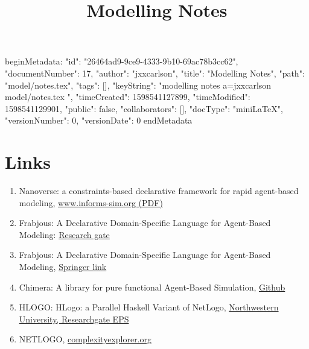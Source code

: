 beginMetadata:
{
    "id": "26464ad9-9ce9-4333-9b10-69ac78b3cc62",
    "documentNumber": 17,
    "author": "jxxcarlson",
    "title": "Modelling Notes",
    "path": "model/notes.tex",
    "tags": [],
    "keyString": "modelling notes a=jxxcarlson model/notes.tex ",
    "timeCreated": 1598541127899,
    "timeModified": 1598541129901,
    "public": false,
    "collaborators": [],
    "docType": "miniLaTeX",
    "versionNumber": 0,
    "versionDate": 0
}
endMetadata
\title{Modelling Notes}

\maketitle

\section{Links}

\begin{enumerate}

\item Nanoverse: a  constraints-based declarative framework for rapid agent-based modeling,
 \href{https://www.informs-sim.org/wsc15papers/017.pdf}{www.informs-sim.org (PDF)}

\item Frabjous: A Declarative Domain-Specific Language for Agent-Based Modeling: \href{https://www.researchgate.net/publication/300865960_Frabjous_A_Declarative_Domain-Specific_Language_for_Agent-Based_Modeling}{Research gate}

\item Frabjous: A Declarative Domain-Specific Language for Agent-Based Modeling, \href{https://link.springer.com/chapter/10.1007/978-3-319-05579-4_47}{Springer link}

\item Chimera: A library for pure functional Agent-Based Simulation, \href{https://github.com/thalerjonathan/chimera}{Github}

\item HLOGO: HLogo: a Parallel Haskell Variant of NetLogo, \href{https://ccl.northwestern.edu/2017/4.pdf}{Northwestern University, Researchgate EPS}

\item NETLOGO, \href{https://www.complexityexplorer.org/courses/101-introduction-to-agent-based-modeling-spring-2020/segments/9191?summary}{complexityexplorer.org}


\end{enumerate}